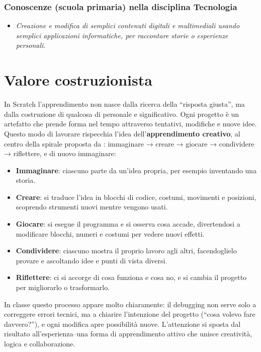 \subsubsection{Conoscenze (scuola primaria) nella disciplina Tecnologia}

\begin{itemize}
\item
  \emph{Creazione e modifica di semplici contenuti digitali e multimediali usando semplici applicazioni informatiche, per raccontare storie o esperienze personali.}
\end{itemize}

\section{Valore costruzionista }\label{valore-costruzionista-5}

In Scratch l'apprendimento non nasce dalla ricerca della ``risposta giusta'', ma dalla costruzione di qualcosa di personale e significativo. Ogni progetto è un artefatto che prende forma nel tempo attraverso tentativi, modifiche e nuove idee. Questo modo di lavorare rispecchia l'idea dell'\textbf{apprendimento creativo}, al centro della spirale proposta da \textcite{resnick-2018}: immaginare → creare → giocare → condividere → riflettere, e di nuovo immaginare:

\begin{itemize}
\item
  \textbf{Immaginare}: ciascuno parte da un'idea propria, per esempio inventando una storia.
\item
  \textbf{Creare}: si traduce l'idea in blocchi di codice, costumi, movimenti e posizioni, scoprendo strumenti nuovi mentre vengono usati.
\item
  \textbf{Giocare}: si esegue il programma e si osserva cosa accade, divertendosi a modificare blocchi, numeri e costumi per vedere nuovi effetti.
\item
  \textbf{Condividere}: ciascuno mostra il proprio lavoro agli altri, facendoglielo provare e ascoltando idee e punti di vista diversi.
\item
  \textbf{Riflettere}: ci si accorge di cosa funziona e cosa no, e si cambia il progetto per migliorarlo o trasformarlo.
\end{itemize}

In classe questo processo appare molto chiaramente: il debugging non serve solo a correggere errori tecnici, ma a chiarire l'intenzione del progetto (``cosa volevo fare davvero?''), e ogni modifica apre possibilità nuove. L'attenzione si sposta dal risultato all'esperienza--una forma di apprendimento attivo che unisce creatività, logica e collaborazione.

